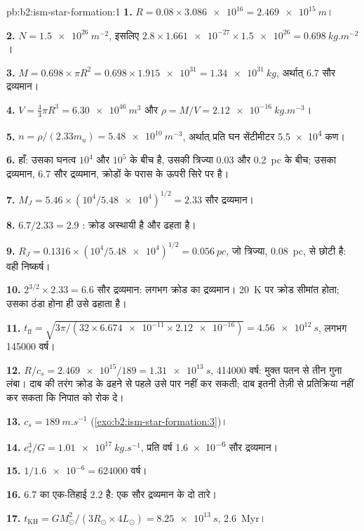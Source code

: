\begin{solution}{pb:b2:ism-star-formation:1}
\textbf{1.} $R = 0.08\times\num{3.086e16} = \qty{2.469e15}{m}$।

\textbf{2.} $N = \qty{1.5e26}{m^{-2}}$, इसलिए $2.8\times\num{1.661e-27}\times\num{1.5e26} =
\qty{0.698}{kg.m^{-2}}$।

\textbf{3.} $M = 0.698\times\pi R^2 = 0.698\times\num{1.915e31} = \qty{1.34e31}{kg}$,
अर्थात् $6.7$ सौर द्रव्यमान।

\textbf{4.} $V = \tfrac43\pi R^3 = \qty{6.30e46}{m^3}$ और
$\rho = M/V = \qty{2.12e-16}{kg.m^{-3}}$।

\textbf{5.} $n = \rho/(2.33m_u) = \qty{5.48e10}{m^{-3}}$, अर्थात् प्रति घन सेंटीमीटर \num{5.5e4}
कण।

\textbf{6.} हाँ: उसका घनत्व $10^4$ और $10^5$ के बीच है, उसकी त्रिज्या 0.03 और
\qty{0.2}{pc} के बीच; उसका द्रव्यमान, 6.7 सौर द्रव्यमान, क्रोडों के परास के ऊपरी सिरे पर है।

\textbf{7.} $M_J = 5.46\times(10^4/\num{5.48e4})^{1/2} = 2.33$ सौर द्रव्यमान।

\textbf{8.} $6.7/2.33 = 2.9$ : क्रोड अस्थायी है और ढहता है।

\textbf{9.} $R_J = 0.1316\times(10^4/\num{5.48e4})^{1/2} = \qty{0.056}{pc}$, जो
त्रिज्या, \qty{0.08}{pc}, से छोटी है: वही निष्कर्ष।

\textbf{10.} $2^{3/2}\times2.33 = 6.6$ सौर द्रव्यमान: लगभग क्रोड का द्रव्यमान।
\qty{20}{K} पर क्रोड सीमांत होता; उसका ठंडा होना ही उसे ढहाता है।

\textbf{11.} $t_{\mathrm{ff}} = \sqrt{3\pi/(32\times\num{6.674e-11}\times\num{2.12e-16})}
= \qty{4.56e12}{s}$, लगभग \num{145000} वर्ष।

\textbf{12.} $R/c_s = \num{2.469e15}/189 = \qty{1.31e13}{s}$, \num{414000} वर्ष: मुक्त पतन से
तीन गुना लंबा। दाब की तरंग क्रोड के ढहने से पहले उसे पार नहीं कर सकती;
दाब इतनी तेज़ी से प्रतिक्रिया नहीं कर सकता कि निपात को रोक दे।

\textbf{13.} $c_s = \qty{189}{m.s^{-1}}$ (\cref{exo:b2:ism-star-formation:3})।

\textbf{14.} $c_s^3/G = \qty{1.01e17}{kg.s^{-1}}$, प्रति वर्ष \num{1.6e-6} सौर द्रव्यमान।

\textbf{15.} $1/\num{1.6e-6} = \num{624000}$ वर्ष।

\textbf{16.} 6.7 का एक-तिहाई $2.2$ है: एक सौर द्रव्यमान के दो तारे।

\textbf{17.} $t_{\mathrm{KH}} = GM_\odot^2/(3R_\odot\times4L_\odot) = \qty{8.25e13}{s}$,
\qty{2.6}{Myr}।


\end{solution}
